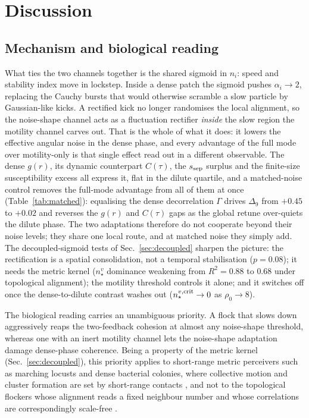 \documentclass[11pt,a4paper]{article}
\begin{document}
\section{Discussion}
\label{sec:disc}

\subsection{Mechanism and biological reading}
\label{sec:disc-mechanism}

What ties the two channels together is the shared sigmoid in
$n_i$: speed and stability index move in lockstep. Inside a
dense patch the sigmoid pushes $\alpha_i \to 2$, replacing the
Cauchy bursts that would otherwise scramble a slow particle by
Gaussian-like kicks. A rectified kick no longer randomises the
local alignment, so the noise-shape channel acts as a
fluctuation rectifier \emph{inside} the slow region the motility
channel carves out. That is the whole of what it does: it lowers
the effective angular noise in the dense phase, and every
advantage of the full mode over motility-only is that single
effect read out in a different observable. The
dense $g(r)$, its dynamic counterpart $C(\tau)$, the
$s_{\rm sep}$ surplus and the finite-size susceptibility excess
all express it, flat in the dilute quartile, and a matched-noise
control removes the full-mode advantage from all of them at once
(Table~\ref{tab:matched}): equalising the dense decorrelation
$\Gamma$ drives $\Delta_9$ from $+0.45$
to $+0.02$ and reverses the $g(r)$ and
$C(\tau)$ gaps as the global retune over-quiets the dilute phase.
The two adaptations therefore do not
cooperate beyond their noise levels; they share one local route,
and at matched noise they simply add. The
decoupled-sigmoid tests of Sec.~\ref{sec:decoupled} sharpen the
picture: the rectification is a spatial consolidation, not a
temporal stabilisation ($p = 0.08$); it needs the metric kernel
($n_\star^v$ dominance weakening from $R^2 = 0.88$ to $0.68$
under topological alignment); the motility threshold controls it
alone; and it switches off once the dense-to-dilute contrast
washes out ($n_\star^{v,{\rm crit}} \to 0$ as $\rho_0 \to 8$).

The biological reading carries an unambiguous priority. A flock
that slows down aggressively reaps the two-feedback cohesion at
almost any noise-shape threshold, whereas one with an inert
motility channel lets the noise-shape adaptation damage
dense-phase coherence. Being a property of the
metric kernel (Sec.~\ref{sec:decoupled}), this priority applies to
short-range metric perceivers such as marching locusts
\citep{Buhl2006, Bazazi2008} and dense bacterial colonies, where
collective motion and cluster formation are set by short-range
contacts \citep{Zhang2010, Peruani2012}, and not to the
topological flockers whose alignment reads a fixed neighbour
number and whose correlations are correspondingly scale-free
\citep{Ballerini2008, Cavagna2010, Ginelli2010}.
\end{document}
